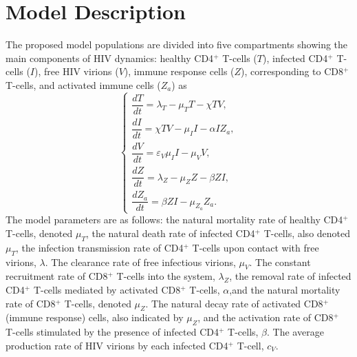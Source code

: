 \documentclass{article}
\theoremstyle{plain}
\theoremstyle{definition}
\numberwithin{equation}{section}
\begin{document}
\section{Model Description}\label{sec2}
























The proposed model populations are divided into five compartments showing the main components of HIV dynamics: healthy CD4$^{+}$ T-cells ($T$), infected CD4$^{+}$ T-cells ($I$), free HIV virions ($V$), immune response cells ($Z$), corresponding to CD8$^{+}$ T-cells, and activated immune cells ($Z_a$) as 
\begin{equation} \label{2-1}
\begin{cases}
\dfrac{dT}{dt} = \lambda_T - \mu_T T - \chi T V, \\[6pt]
\dfrac{dI}{dt} = \chi T V - \mu_I I - \alpha I Z_a, \\[6pt]
\dfrac{dV}{dt} = \varepsilon_V \mu_I I - \mu_V V, \\[6pt]
\dfrac{dZ}{dt} = \lambda_Z - \mu_Z Z - \beta Z I, \\[6pt]
\dfrac{dZ_a}{dt} = \beta Z I - \mu_{Z_a} Z_a .
\end{cases}
\end{equation}
The model parameters are as follows: the natural mortality rate of healthy CD4\(^+\) T-cells, denoted \(\mu_T\), the natural death rate of infected CD4\(^+\) T-cells, also denoted \(\mu_T\), the infection transmission rate of CD4\(^+\) T-cells upon contact with free virions, \(\lambda\). The clearance rate of free infectious virions, \(\mu_V\). The constant recruitment rate of CD8\(^+\) T-cells into the system, \(\lambda_Z\), the removal rate of infected CD4\(^+\) T-cells mediated by activated CD8\(^+\) T-cells, \(\alpha\),and the natural mortality rate of CD8\(^+\) T-cells, denoted \(\mu_Z\). The natural decay rate of activated CD8\(^+\) (immune response) cells, also indicated by \(\mu_Z\), and the activation rate of CD8\(^+\) T-cells stimulated by the presence of infected CD4\(^+\) T-cells, \(\beta\). The average production rate of HIV virions by each infected CD4\(^+\) T-cell, \(c_V\).
\end{document}
